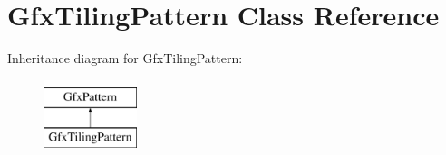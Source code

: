 \hypertarget{class_gfx_tiling_pattern}{}\section{Gfx\+Tiling\+Pattern Class Reference}
\label{class_gfx_tiling_pattern}
Inheritance diagram for Gfx\+Tiling\+Pattern\+:\begin{figure}[H]
\begin{center}
\leavevmode
\includegraphics[height=2.000000cm]{class_gfx_tiling_pattern}
\end{center}
\end{figure}

